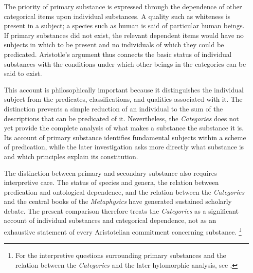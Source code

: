 \label{para:VS.B01.P01.C08.S05.SS03.P003}

The priority of primary substance is expressed through
the dependence of other categorical items upon individual
substances. A quality such as whiteness is present in
a subject; a species such as human is said of particular
human beings. If primary substances did not exist,
the relevant dependent items would have no subjects
in which to be present and no individuals of which
they could be predicated. Aristotle's argument thus
connects the basic status of individual substances
with the conditions under which other beings in the
categories can be said to exist. \cite{AristotleCategories,
CohenReeveAristotleMetaphysics2025}

\label{para:VS.B01.P01.C08.S05.SS03.P004}

This account is philosophically important because it
distinguishes the individual subject from the predicates,
classifications, and qualities associated with it.
The distinction prevents a simple reduction of an
individual to the sum of the descriptions that can
be predicated of it. Nevertheless, the \textit{Categories}
does not yet provide the complete analysis of what
makes a substance the substance it is. Its account
of primary substance identifies fundamental subjects
within a scheme of predication, while the later
investigation asks more directly what substance is
and which principles explain its constitution.

\label{para:VS.B01.P01.C08.S05.SS03.P005}

The distinction between primary and secondary substance
also requires interpretive care. The status of species
and genera, the relation between predication and
ontological dependence, and the relation between
the \textit{Categories} and the central books of
the \textit{Metaphysics} have generated sustained
scholarly debate. The present comparison therefore
treats the \textit{Categories} as a significant
account of individual substances and categorical
dependence, not as an exhaustive statement of every
Aristotelian commitment concerning substance. \footnote{For
the interpretive questions surrounding primary substances
and the relation between the \textit{Categories} and
the later hylomorphic analysis, see
\cite{CohenReeveAristotleMetaphysics2025}.}


